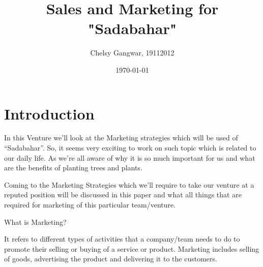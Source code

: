 \documentclass{article}
\title{\textbf{Sales and Marketing for "Sadabahar"}}
\author{Chelsy Gangwar, 19112012}
\date{\today}
\begin{document}
\maketitle

\section{Introduction}

\setlength{\parskip}{1em}

\large In this Venture we’ll look at the Marketing strategies which will be used of “Sadabahar”. So, it seems very exciting to work on such topic which is related to our daily life. As we’re all aware of why it is so much important for us and what are the benefits of planting trees and plants. 
\setlength{\parskip}{1em}

\large Coming to the Marketing Strategies which we’ll require to take our venture at a reputed position will be discussed in this paper and what all things that are required for marketing of this particular team/venture.
\setlength{\parskip}{1em}

\large What is Marketing?

\large It refers to different types of activities that a company/team needs to do to promote their selling or buying of a service or product. Marketing includes selling of goods, advertising the product and delivering it to the customers.

\setlength{\parskip}{1em}
\end{document}
